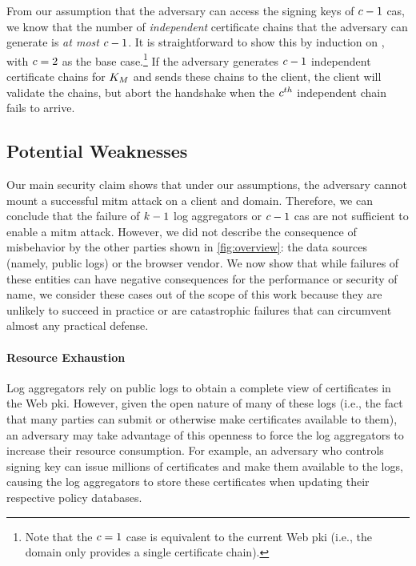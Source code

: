 
From our assumption that the adversary can access the signing keys
of $c - 1$ \acp{ca},
we know that the number of \emph{independent} certificate chains that the adversary can generate
is \emph{at most} $c - 1$. It is straightforward to show this by induction
on \policy, with $c = 2$ as the base case.\footnote{Note that the $c
= 1$ case is equivalent to the current Web \ac{pki} (i.e., the domain only
provides a single certificate chain).} If the adversary generates $c - 1$
independent certificate chains for $K_M$ and sends these chains to
the client, the client will validate the chains, but abort the handshake when
the $c^{th}$ independent chain fails to arrive. 

\subsection{Potential Weaknesses}
\label{sec:analysis:weaknesses}

Our main security claim shows that under our assumptions, the adversary cannot
mount a successful \ac{mitm} attack on a client and domain. Therefore, we can
conclude that the failure of $k - 1$ log aggregators or $c - 1$ \acp{ca} 
are not sufficient to
enable a \ac{mitm} attack. However, we did not describe the consequence of
misbehavior by the other parties shown in \autoref{fig:overview}: the data
sources (namely, public logs) or the browser vendor. We now show that while
failures of these entities can have negative consequences for the performance or
security of \ac{name}, we consider these cases out of the scope of this work
because they are unlikely to succeed in practice or are catastrophic failures
that can circumvent almost any practical defense.

\paragraph{Resource Exhaustion}

Log aggregators rely on public logs to obtain a complete view of certificates in
the Web \ac{pki}. However, given the open nature of many of these logs (i.e.,
the fact that many parties can submit or otherwise make
certificates available to them), an adversary may take advantage of this
openness to force the log aggregators to increase their resource consumption.
For example, an adversary who controls  signing key can issue millions
of certificates and make them available to the logs, causing the log aggregators
to store these certificates when updating their respective policy databases.

